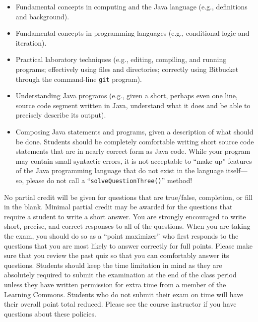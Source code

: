 \documentclass[11pt]{article}
\begin{document}
\vspace*{-.05in}
\begin{itemize}

  \itemsep 0in

  \item Fundamental concepts in computing and the Java language (e.g., definitions and background).

  \item Fundamental concepts in programming languages (e.g., conditional logic and iteration).

  \item Practical laboratory techniques (e.g., editing, compiling, and running programs; effectively using files and
    directories; correctly using Bitbucket through the command-line {\tt git} program).

  \item Understanding Java programs (e.g., given a short, perhaps even one line, source code segment written in Java,
    understand what it does and be able to precisely describe its output).

  \item Composing Java statements and programs, given a description of what should be done. Students should be completely
    comfortable writing short source code statements that are in nearly correct form as Java code. While your program may
    contain small syntactic errors, it is not acceptable to ``make up'' features of the Java programming language that do
    not exist in the language itself---so, please do not call a ``{\tt solveQuestionThree()}'' method!

\end{itemize}

\noindent No partial credit will be given for questions that are true/false, completion, or fill in the blank. Minimal
partial credit may be awarded for the questions that require a student to write a short answer. You are strongly
encouraged to write short, precise, and correct responses to all of the questions. When you are taking the exam, you
should do so as a ``point maximizer'' who first responds to the questions that you are most likely to answer correctly
for full points. Please make sure that you review the past quiz so that you can comfortably answer its questions.
Students should keep the time limitation in mind as they are absolutely required to submit the examination at the end of
the class period unless they have written permission for extra time from a member of the Learning Commons. Students who
do not submit their exam on time will have their overall point total reduced. Please see the course instructor if you
have questions about these policies.
\end{document}
